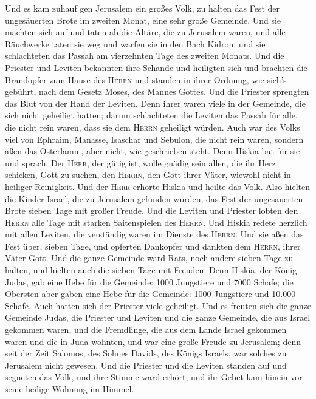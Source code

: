  Und es kam zuhauf gen Jerusalem ein großes Volk, zu
halten das Fest der ungesäuerten Brote im zweiten Monat, eine sehr große
Gemeinde.  Und sie machten sich auf und taten ab die
Altäre, die zu Jerusalem waren, und alle Räuchwerke taten sie weg und
warfen sie in den Bach Kidron;  und sie schlachteten das
Passah am vierzehnten Tage des zweiten Monats. Und die Priester und
Leviten bekannten ihre Schande und heiligten sich und brachten die
Brandopfer zum Hause des \textsc{Herrn}  und standen in
ihrer Ordnung, wie sich's gebührt, nach dem Gesetz Moses, des Mannes
Gottes. Und die Priester sprengten das Blut von der Hand der Leviten.
 Denn ihrer waren viele in der Gemeinde, die sich nicht
geheiligt hatten; darum schlachteten die Leviten das Passah für alle,
die nicht rein waren, dass sie dem \textsc{Herrn} geheiligt würden.
 Auch war des Volks viel von Ephraim, Manasse, Isaschar
und Sebulon, die nicht rein waren, sondern aßen das Osterlamm, aber
nicht, wie geschrieben steht. Denn Hiskia bat für sie und sprach: Der
\textsc{Herr}, der gütig ist, wolle gnädig sein  allen,
die ihr Herz schicken, Gott zu suchen, den \textsc{Herrn}, den Gott
ihrer Väter, wiewohl nicht in heiliger Reinigkeit.  Und
der \textsc{Herr} erhörte Hiskia und heilte das Volk. 
Also hielten die Kinder Israel, die zu Jerusalem gefunden wurden, das
Fest der ungesäuerten Brote sieben Tage mit großer Freude. Und die
Leviten und Priester lobten den \textsc{Herrn} alle Tage mit starken
Saitenspielen des \textsc{Herrn}.  Und Hiskia redete
herzlich mit allen Leviten, die verständig waren im Dienste des
\textsc{Herrn}. Und sie aßen das Fest über, sieben Tage, und opferten
Dankopfer und dankten dem \textsc{Herrn}, ihrer Väter Gott.
 Und die ganze Gemeinde ward Rats, noch andere sieben
Tage zu halten, und hielten auch die sieben Tage mit Freuden.
 Denn Hiskia, der König Judas, gab eine Hebe für die
Gemeinde: 1000 Jungstiere und 7000 Schafe; die Obersten aber gaben eine
Hebe für die Gemeinde: 1000 Jungstiere und 10.000 Schafe. Auch hatten
sich der Priester viele geheiligt.  Und es freuten sich
die ganze Gemeinde Judas, die Priester und Leviten und die ganze
Gemeinde, die aus Israel gekommen waren, und die Fremdlinge, die aus dem
Lande Israel gekommen waren und die in Juda wohnten,  und
war eine große Freude zu Jerusalem; denn seit der Zeit Salomos, des
Sohnes Davids, des Königs Israels, war solches zu Jerusalem nicht
gewesen.  Und die Priester und die Leviten standen auf
und segneten das Volk, und ihre Stimme ward erhört, und ihr Gebet kam
hinein vor seine heilige Wohnung im Himmel.

